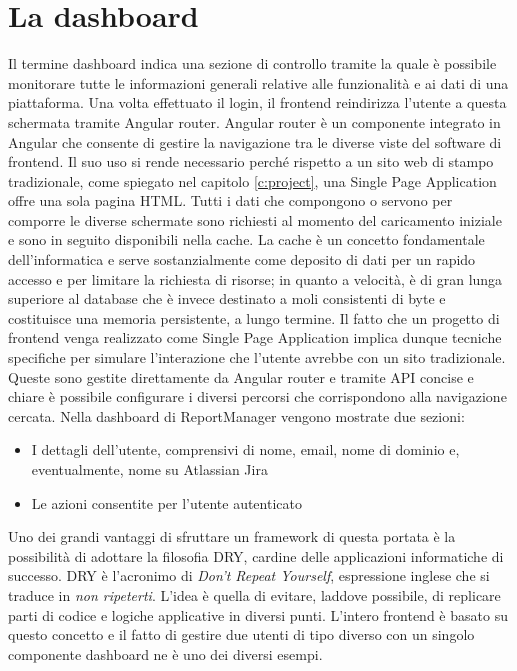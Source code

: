 \section{La dashboard}

Il termine dashboard indica una sezione di controllo tramite la quale è possibile monitorare tutte le informazioni generali relative alle funzionalità e ai dati
di una piattaforma.
Una volta effettuato il login, il frontend reindirizza l'utente a questa schermata tramite Angular router.
Angular router è un componente integrato in Angular che consente di gestire la navigazione tra le diverse viste del software di frontend.
Il suo uso si rende necessario perché rispetto a un sito web di stampo tradizionale, come spiegato nel capitolo \ref{c:project}, una Single Page Application offre una sola 
pagina HTML.
Tutti i dati che compongono o servono per comporre le diverse schermate sono richiesti al momento del caricamento iniziale e sono in seguito disponibili nella cache.
La cache è un concetto fondamentale dell'informatica e serve sostanzialmente come deposito di dati per un rapido accesso e per limitare la richiesta di risorse; in quanto a velocità, 
è di gran lunga superiore al database che è invece destinato a moli consistenti di byte e costituisce una memoria persistente, a lungo termine.
Il fatto che un progetto di frontend venga realizzato come Single Page Application implica dunque tecniche specifiche per simulare l'interazione che l'utente avrebbe con un sito
tradizionale. Queste sono gestite direttamente da Angular router e tramite API concise e chiare è possibile configurare i diversi percorsi che corrispondono alla navigazione cercata.
Nella dashboard di ReportManager vengono mostrate due sezioni:
\begin{itemize}
    \item I dettagli dell'utente, comprensivi di nome, email, nome di dominio e, eventualmente, nome su Atlassian Jira
    \item Le azioni consentite per l'utente autenticato
\end{itemize}
Uno dei grandi vantaggi di sfruttare un framework di questa portata è la possibilità di adottare la filosofia DRY, cardine delle applicazioni informatiche di successo.
DRY è l'acronimo di \emph{Don't Repeat Yourself}, espressione inglese che si traduce in \emph{non ripeterti}.
L'idea è quella di evitare, laddove possibile, di replicare parti di codice e logiche applicative in diversi punti.
L'intero frontend è basato su questo concetto e il fatto di gestire due utenti di tipo diverso con un singolo componente dashboard ne è uno dei diversi esempi.
